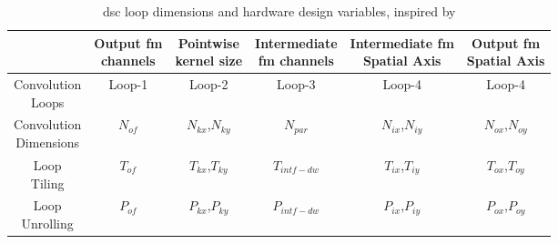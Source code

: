%
\begin{table}[H]
    \centering
    \begin{tabular}{c|c|c|c|c|c}
    \hline \hline
    & \makecell{Output \acrshort{fm} \\ channels} & \makecell{Pointwise \\ kernel size} & \makecell{Intermediate\\\acrshort{fm} channels} & \makecell{Intermediate \acrshort{fm} \\ Spatial Axis} & \makecell{Output \acrshort{fm} \\ Spatial Axis} \\
    \hline
    \makecell{Convolution \\ Loops}      & Loop-1   & Loop-2            & Loop-3     & Loop-4            & Loop-4 \\
    \makecell{Convolution \\ Dimensions} & $N_{of}$ & $N_{kx}$,$N_{ky}$ & $N_{par}$  & $N_{ix}$,$N_{iy}$ & $N_{ox}$,$N_{oy}$\\
    \makecell{Loop \\ Tiling}            & $T_{of}$ & $T_{kx}$,$T_{ky}$ & $T_{intf-dw}$ & $T_{ix}$,$T_{iy}$ & $T_{ox}$,$T_{oy}$\\
    \makecell{Loop \\ Unrolling}         & $P_{of}$ & $P_{kx}$,$P_{ky}$ & $P_{intf-dw}$ & $P_{ix}$,$P_{iy}$ & $P_{ox}$,$P_{oy}$\\
    \hline \hline
    \end{tabular}
    \caption{\acrshort{dsc} loop dimensions and hardware design variables, inspired by \cite{ma_optimizing_2018}}
    \label{tab:param_dsc}
\end{table}
%
